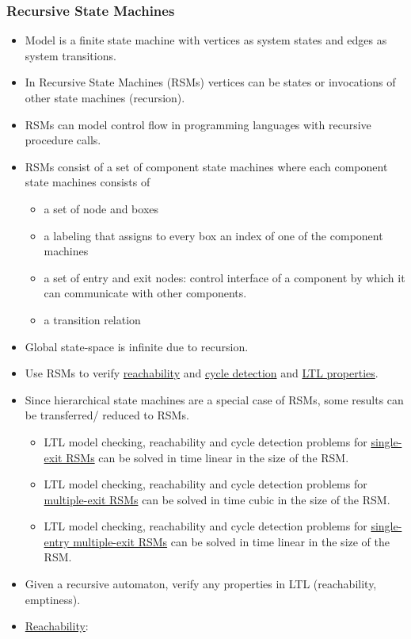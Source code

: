\documentclass[a4paper,12pt]{article}
\begin{document}
\subsubsection{Recursive State Machines}
\begin{itemize}
	\item Model is a finite state machine with vertices as system states and edges as system transitions.
	\item In Recursive State Machines (RSMs) vertices can be states or invocations of other state machines (recursion).
	\item RSMs can model control flow in programming languages with recursive procedure calls.
	\item RSMs consist of a set of component state machines where each component state machines consists of
	\begin{itemize}
		\item a set of node and boxes
		\item a labeling that assigns to every box an index of one of the component machines
		\item a set of entry and exit nodes: control interface of a component by which it can communicate with other components.
		\item a transition relation 
	\end{itemize}
	\item Global state-space is infinite due to recursion.
	\item Use RSMs to verify \ul{reachability} and \ul{cycle detection} and \ul{LTL properties}.
	\item Since hierarchical state machines are a special case of RSMs, some results can be transferred/ reduced to RSMs.
	\begin{itemize}
		\item LTL model checking, reachability and cycle detection problems for \ul{single-exit RSMs} can be solved in time linear in the size of the RSM.
		\item LTL model checking, reachability and cycle detection problems for \ul{multiple-exit RSMs} can be solved in time cubic in the size of the RSM.
		\item LTL model checking, reachability and cycle detection problems for \ul{single-entry multiple-exit RSMs} can be solved in time linear in the size of the RSM.
	\end{itemize}
	\item Given a recursive automaton, verify any properties in LTL (reachability, emptiness).
	\item \ul{Reachability}:

\end{itemize}
\end{document}
